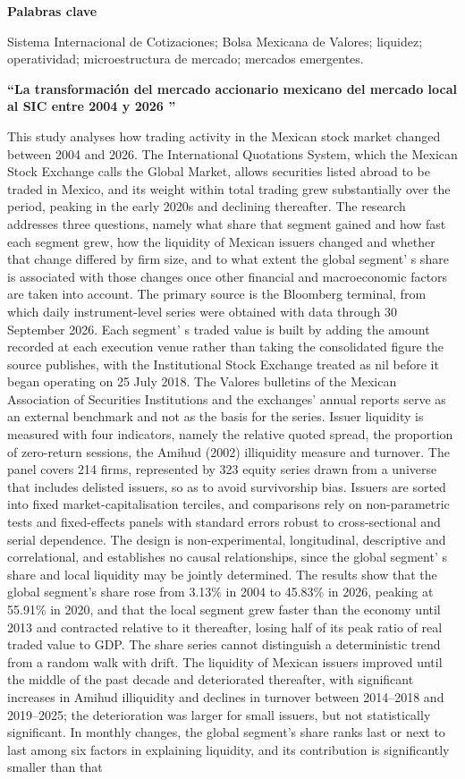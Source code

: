 \textbf{Palabras clave}

Sistema Internacional de Cotizaciones; Bolsa Mexicana de Valores; liquidez; operatividad; microestructura de mercado; mercados emergentes.

\textbf{``La transformación del mercado accionario mexicano del mercado local al SIC entre 2004 y 2026 ''}


This study analyses how trading activity in the Mexican stock market changed between 2004 and 2026. The International Quotations System, which the Mexican Stock Exchange calls the Global Market, allows securities listed abroad to be traded in Mexico, and its weight within total trading grew substantially over the period, peaking in the early 2020s and declining thereafter. The research addresses three questions, namely what share that segment gained and how fast each segment grew, how the liquidity of Mexican issuers changed and whether that change differed by firm size, and to what extent the global segment' s share is associated with those changes once other financial and macroeconomic factors are taken into account. The primary source is the Bloomberg terminal, from which daily instrument-level series were obtained with data through 30 September 2026. Each segment' s traded value is built by adding the amount recorded at each execution venue rather than taking the consolidated figure the source publishes, with the Institutional Stock Exchange treated as nil before it began operating on 25 July 2018. The Valores bulletins of the Mexican Association of Securities Institutions and the exchanges' annual reports serve as an external benchmark and not as the basis for the series. Issuer liquidity is measured with four indicators, namely the relative quoted spread, the proportion of zero-return sessions, the Amihud (2002) illiquidity measure and turnover. The panel covers 214 firms, represented by 323 equity series drawn from a universe that includes delisted issuers, so as to avoid survivorship bias. Issuers are sorted into fixed market-capitalisation terciles, and comparisons rely on non-parametric tests and fixed-effects panels with standard errors robust to cross-sectional and serial dependence. The design is non-experimental, longitudinal, descriptive and correlational, and establishes no causal relationships, since the global segment' s share and local liquidity may be jointly determined. The results show that the global segment's share rose from 3.13\% in 2004 to 45.83\% in 2026, peaking at 55.91\% in 2020, and that the local segment grew faster than the economy until 2013 and contracted relative to it thereafter, losing half of its peak ratio of real traded value to GDP. The share series cannot distinguish a deterministic trend from a random walk with drift. The liquidity of Mexican issuers improved until the middle of the past decade and deteriorated thereafter, with significant increases in Amihud illiquidity and declines in turnover between 2014--2018 and 2019--2025; the deterioration was larger for small issuers, but not statistically significant. In monthly changes, the global segment's share ranks last or next to last among six factors in explaining liquidity, and its contribution is significantly smaller than that 